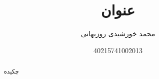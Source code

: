 \documentclass[a4paper,10pt]{article}
\title{عنوان}
\author{محمد خورشیدی روزبهانی\and 40215741002013}
\date{}
\begin{document}
    \maketitle

    \begin{abstract}
        
        چکیده

    \end{abstract}
    
\end{document}
